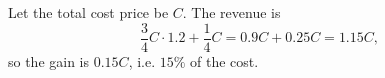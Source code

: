 Let the total cost price be $C$. The revenue is
\[\dfrac34C\cdot1.2+\dfrac14C=0.9C+0.25C=1.15C,\]
so the gain is $0.15C$, i.e. $\boxed{15\%}$ of the cost.
